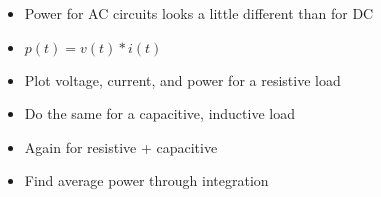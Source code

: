 \begin{itemize}
\item Power for AC circuits looks a little different than for DC
\item $p(t) = v(t)*i(t)$ %
\item Plot voltage, current, and power for a resistive load
\item Do the same for a capacitive, inductive load
\item Again for resistive + capacitive
\item Find average power through integration
\end{itemize}
